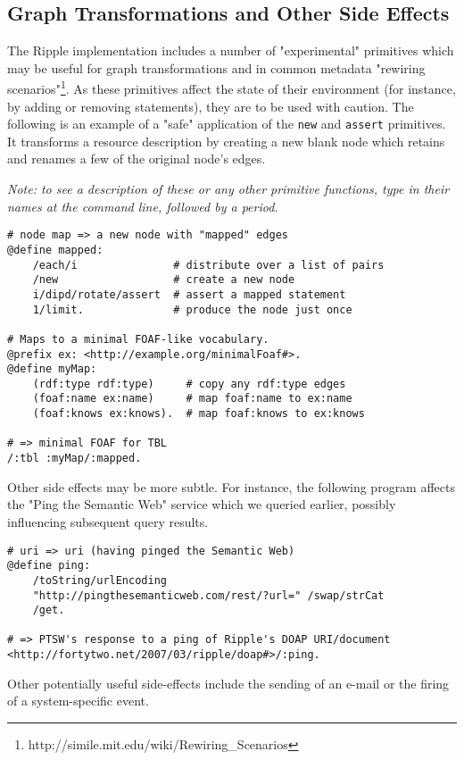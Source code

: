 \documentclass[runningheads]{llncs}
\begin{document}
\subsection{Graph Transformations and Other Side Effects}
The Ripple implementation includes a number of "experimental" primitives which may be useful for graph transformations and in common metadata "rewiring scenarios"\footnote{http://simile.mit.edu/wiki/Rewiring\_Scenarios}.  As these primitives affect the state of their environment (for instance, by adding or removing statements), they are to be used with caution.  The following is an example of a "safe" application of the \texttt{new} and \texttt{assert} primitives.  It transforms a resource description by creating a new blank node which retains and renames a few of the original node's edges.

\textit{Note: to see a description of these or any other primitive functions, type in their names at the command line, followed by a period.}
\begin{verbatim}
# node map => a new node with "mapped" edges
@define mapped:
    /each/i               # distribute over a list of pairs
    /new                  # create a new node
    i/dipd/rotate/assert  # assert a mapped statement
    1/limit.              # produce the node just once

# Maps to a minimal FOAF-like vocabulary.
@prefix ex: <http://example.org/minimalFoaf#>.
@define myMap:
    (rdf:type rdf:type)     # copy any rdf:type edges
    (foaf:name ex:name)     # map foaf:name to ex:name
    (foaf:knows ex:knows).  # map foaf:knows to ex:knows

# => minimal FOAF for TBL
/:tbl :myMap/:mapped.
\end{verbatim}

Other side effects may be more subtle.  For instance, the following program affects the "Ping the Semantic Web" service which we queried earlier, possibly influencing subsequent query results.
\begin{verbatim}
# uri => uri (having pinged the Semantic Web)
@define ping:
    /toString/urlEncoding
    "http://pingthesemanticweb.com/rest/?url=" /swap/strCat
    /get.

# => PTSW's response to a ping of Ripple's DOAP URI/document
<http://fortytwo.net/2007/03/ripple/doap#>/:ping.
\end{verbatim}

Other potentially useful side-effects include the sending of an e-mail or the firing of a system-specific event.
\end{document}
